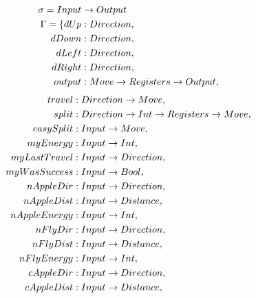 \documentclass[12pt,a4paper]{report}
\begin{document}
\begin{align*}
\sigma = Input &\rightarrow Output\\
\Gamma = \{
dUp              &: Direction                                       ,\\              
dDown            &: Direction                                       ,\\              
dLeft            &: Direction                                       ,\\              
dRight           &: Direction                                       ,\\            
output           &: Move \rightarrow Registers \rightarrow Output                   ,\\            
\end{align*}
\begin{align*}
travel           &: Direction \ar Move                              ,\\          
split            &: Direction \ar Int \ar Registers \ar Move        ,\\       
easySplit        &: Input \ar Move                                  ,\\     
myEnergy         &: Input \ar Int                                   ,\\     
myLastTravel     &: Input \ar Direction                             ,\\                
myWasSuccess     &: Input \ar Bool                                  ,\\      
nAppleDir        &: Input \ar Direction                             ,\\                    
nAppleDist       &: Input \ar Distance                              ,\\                   
nAppleEnergy     &: Input \ar Int                                   ,\\              
nFlyDir          &: Input \ar Direction                             ,\\                      
nFlyDist         &: Input \ar Distance                              ,\\                    
nFlyEnergy       &: Input \ar Int                                   ,\\              
cAppleDir        &: Input \ar Direction                             ,\\          
cAppleDist       &: Input \ar Distance                              ,\\        

\end{align*}
\end{document}
